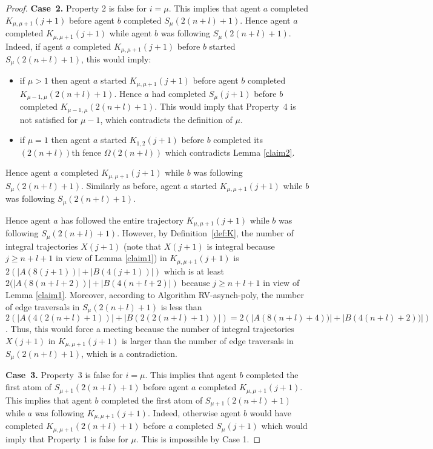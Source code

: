 \documentclass [11pt] {article}
\begin{document}
\begin{proof}
{\bf Case~2.} Property 2 is false for $i=\mu$. This implies that agent $a$ completed $K_{{\mu,\mu+1}}(j+1)$ before agent $b$ completed $S_{\mu}(2(n+l)+1)$. Hence agent $a$ completed $K_{{\mu,\mu+1}}(j+1)$ while agent $b$ was following 
$S_{\mu}(2(n+l)+1)$. Indeed, if agent $a$ completed $K_{{\mu,\mu+1}}(j+1)$ before $b$ started $S_{\mu}(2(n+l)+1)$, this would imply:
\begin{itemize}
\item if $\mu>1$ then agent $a$ started $K_{{\mu,\mu+1}}(j+1)$ before agent $b$ completed $K_{{\mu-1,\mu}}(2(n+l)+1)$. Hence $a$ had completed $S_{\mu}(j+1)$ before $b$ completed $K_{{\mu-1,\mu}}(2(n+l)+1)$. This would imply that Property~4 is not satisfied for $\mu-1$, which contradicts the definition of $\mu$. 

\item if $\mu=1$ then agent $a$ started $K_{{1,2}}(j+1)$ before $b$ completed its $(2(n+l))$th fence  $\Omega(2(n+l))$ which contradicts Lemma \ref{claim2}.
\end{itemize}
Hence agent $a$ completed $K_{{\mu,\mu+1}}(j+1)$ while $b$ was following $S_{\mu}(2(n+l)+1)$. Similarly as before, agent $a$ started $K_{{\mu,\mu+1}}(j+1)$ while $b$ was
following $S_{\mu}(2(n+l)+1)$.

Hence agent $a$ has followed the entire trajectory $K_{{\mu,\mu+1}}(j+1)$ while $b$ was following $S_{\mu}(2(n+l)+1)$. 
However, by Definition~\ref{def:K}, the number of integral trajectories $X(j+1)$ (note that $X(j+1)$ is integral because $j\ge n+l+1$ in view of Lemma \ref{claim1}) in $K_{{\mu,\mu+1}}(j+1)$ is $2(|A(8(j+1))|+|B(4(j+1))|)$ which is at least $2(|A(8(n+l+2))|+|B(4(n+l+2)|)$ because $j\ge n+l+1$ in view of Lemma \ref{claim1}. Moreover, according to Algorithm RV-asynch-poly, the number of {edge traversals} in $S_{\mu}(2(n+l)+1)$ is less than $2(|A(4(2(n+l)+1))|+|B(2(2(n+l)+1))|)=2(|A(8(n+l)+4))|+|B(4(n+l)+2))|)$. Thus, this would force a meeting because the number of integral trajectories $X(j+1)$ in $K_{{\mu,\mu+1}}(j+1)$ is larger than the number of {edge traversals} in $S_{\mu}(2(n+l)+1)$, which is a contradiction.  



{\bf Case~3.} Property~3 is false for $i=\mu$. This implies that agent $b$ completed the first atom of  $S_{{\mu+1}}(2(n+l)+1)$ before agent $a$ completed $K_{{\mu,\mu+1}}(j+1)$. This implies that agent $b$ completed the first atom of  $S_{{\mu+1}}(2(n+l)+1)$ while $a$ was following $K_{{\mu,\mu+1}}(j+1)$. Indeed, otherwise agent $b$ would have completed $K_{{\mu,\mu+1}}(2(n+l)+1)$ before $a$ completed $S_{{\mu}}(j+1)$ which would imply that Property 1 is false for $\mu$. This
is impossible by Case 1.


\end{proof}
\end{document}
